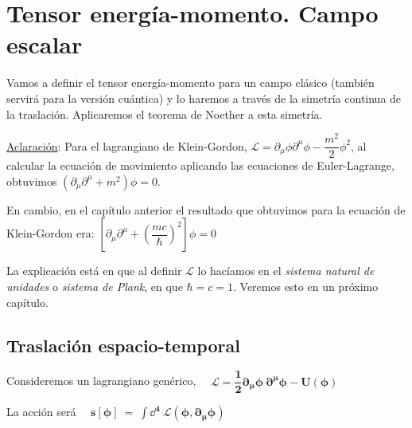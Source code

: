\chapter{Tensor energía-momento. Campo escalar}



\vspace{10mm}
\begin{adjustwidth}{50pt}{50pt}
\begin{ejemplo}
Vamos a definir el tensor energía-momento para un campo clásico (también servirá para la versión cuántica) y lo haremos a través de la simetría continua de la traslación. Aplicaremos el teorema de Noether a esta simetría.

\end{ejemplo}
\end{adjustwidth}
\vspace{10mm}

\begin{ejemplo}
\underline{Aclaración}:  Para el lagrangiano de Klein-Gordon, 	$\mathcal L=\partial_\mu \phi \partial^\mu \phi - \dfrac{m^2}{2} \phi^2$, al calcular la ecuación de movimiento aplicando las ecuaciones de Euler-Lagrange, obtuvimos $\left(\partial_\mu \partial^\mu + m^2 \right) \phi = 0$.

En cambio, en el capítulo anterior el resultado que obtuvimos para la ecuación de Klein-Gordon era: $\left[\partial_\mu \partial^\mu + \left( \dfrac{mc}{\hbar} \right)^2 \right] \phi  = 0$

La explicación está en que al definir $\mathcal L$ lo hacíamos en el \emph{sistema natural de unidades} o \emph{sistema de Plank}, en que $\hbar=c=1$. Veremos esto en un próximo capítulo.
\end{ejemplo}

\vspace{5mm}
\section{Traslación espacio-temporal}

Consideremos un lagrangiano genérico, $\quad \boldsymbol{ \mathcal L=\dfrac 1 2 \partial_\mu \phi \ \partial^\mu \phi - U(\phi)}$

La acción será $\quad \boldsymbol{ s[\phi] \ = \ \displaystyle \int \dd^4 \ \mathcal L (\phi, \partial_\mu \phi) }$

